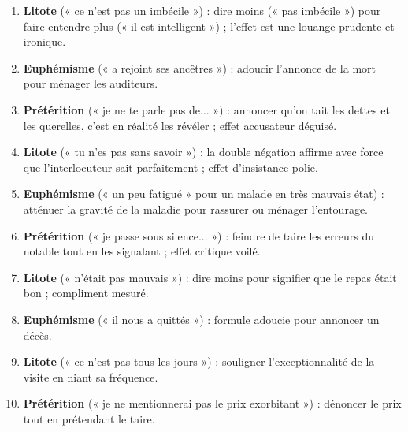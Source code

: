 \documentclass[11pt]{article}
\begin{document}
\begin{corrige}
\begin{enumerate}
\item \textbf{Litote} (« ce n'est pas un imbécile ») : dire moins (« pas imbécile ») pour faire entendre plus (« il est intelligent ») ; l'effet est une louange prudente et ironique.
\item \textbf{Euphémisme} (« a rejoint ses ancêtres ») : adoucir l'annonce de la mort pour ménager les auditeurs.
\item \textbf{Prétérition} (« je ne te parle pas de... ») : annoncer qu'on tait les dettes et les querelles, c'est en réalité les révéler ; effet accusateur déguisé.
\item \textbf{Litote} (« tu n'es pas sans savoir ») : la double négation affirme avec force que l'interlocuteur sait parfaitement ; effet d'insistance polie.
\item \textbf{Euphémisme} (« un peu fatigué » pour un malade en très mauvais état) : atténuer la gravité de la maladie pour rassurer ou ménager l'entourage.
\item \textbf{Prétérition} (« je passe sous silence... ») : feindre de taire les erreurs du notable tout en les signalant ; effet critique voilé.
\item \textbf{Litote} (« n'était pas mauvais ») : dire moins pour signifier que le repas était bon ; compliment mesuré.
\item \textbf{Euphémisme} (« il nous a quittés ») : formule adoucie pour annoncer un décès.
\item \textbf{Litote} (« ce n'est pas tous les jours ») : souligner l'exceptionnalité de la visite en niant sa fréquence.
\item \textbf{Prétérition} (« je ne mentionnerai pas le prix exorbitant ») : dénoncer le prix tout en prétendant le taire.
\end{enumerate}
\end{corrige}
\end{document}
